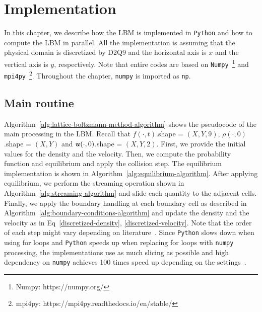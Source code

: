 \chapter{Implementation}
\vspace{-8mm}
In this chapter, we describe how the LBM is implemented in {\tt Python}
and how to compute the LBM in parallel.
All the implementation is assuming that
the physical domain is discretized by D2Q9
and the horizontal axis is $x$ and 
the vertical axis is $y$, respectively.
Note that entire codes are based on
{\tt Numpy}~\footnote{Numpy: https://numpy.org/}
and {\tt mpi4py}~\footnote{mpi4py: https://mpi4py.readthedocs.io/en/stable/}.
Throughout the chapter, {\tt numpy} is imported as {\tt np}.

\section{Main routine}
Algorithm~\ref{alg:lattice-boltzmann-method-algorithm}
shows the pseudocode of the main processing in the LBM.
Recall that $f(\cdot, t)$.shape = $(X, Y, 9)$,
$\rho(\cdot, 0)$.shape = $(X, Y)$ and $\boldsymbol{u}(\cdot, 0)$.shape = $(X, Y, 2)$.
First, we provide the initial values for the density and the velocity.
Then, we compute the probability function and equilibrium and
apply the collision step.
The equilibrium implementation is shown in Algorithm~\ref{alg:equilibrium-algorithm}.
After applying equilibrium, we perform the
streaming operation shown in Algorithm~\ref{alg:streaming-algorithm}
and slide each quantity to the adjacent cells.
Finally, we apply the boundary handling at each boundary cell as 
described in Algorithm~\ref{alg:boundary-conditions-algorithm}
and update the density and the velocity as in Eq~\ref{discretized-density}, \ref{discretized-velocity}.
Note that the order of each step might vary depending on literature~\cite{timm2016lattice, succi2018lattice}.
Since {\tt Python} slows down when using for loops
and {\tt Python} speeds up when replacing for loops with {\tt numpy} processing,
the implementations use as much slicing as possible
and high dependency on {\tt numpy} achieves 100 times speed up depending on
the settings~\cite{van2011numpy}. 

